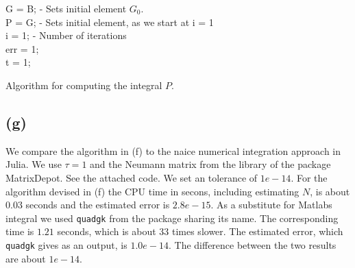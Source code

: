 \begin{algorithm}[H]
 G = B;  - Sets initial element $G_0$.\\
 P = G; - Sets initial element, as we start at i = 1\\
 i = 1; - Number of iterations \\
 err = 1;\\
 t = 1;\\
 \caption{Algorithm for computing the integral $P$.}
\end{algorithm}

\subsection*{(g)}
We compare the algorithm in (f) to the naice numerical integration approach in Julia. We use $\tau = 1$ and the Neumann matrix from the library of the package  MatrixDepot. See the attached code. We set an tolerance of $1e-14$. For the algorithm devised in (f) the CPU time in secons, including estimating $N$, is about $0.03$ seconds and the estimated error is $2.8e-15$. As a substitute for Matlabs integral we used \texttt{quadgk} from the package sharing its name. The corresponding time is $1.21$ seconds, which is about $33$ times slower. The estimated error, which \texttt{quadgk} gives as an output, is $1.0e-14$. The difference between the two results are about $1e-14$.
